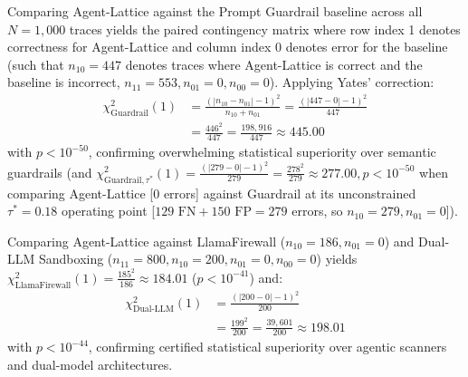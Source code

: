 \documentclass[conference,10pt]{IEEEtran}
\begin{document}
Comparing Agent-Lattice against the Prompt Guardrail baseline across all $N = 1{,}000$ traces yields the paired contingency matrix where row index 1 denotes correctness for Agent-Lattice and column index 0 denotes error for the baseline (such that $n_{10} = 447$ denotes traces where Agent-Lattice is correct and the baseline is incorrect, $n_{11} = 553, n_{01} = 0, n_{00} = 0$). Applying Yates' correction:
\begin{equation}
\begin{split}
\chi^2_{\text{Guardrail}}(1) &= \frac{(|n_{10} - n_{01}| - 1)^2}{n_{10} + n_{01}} = \frac{(|447 - 0| - 1)^2}{447} \\
&= \frac{446^2}{447} = \frac{198{,}916}{447} \approx 445.00
\end{split}
\end{equation}
with $p < 10^{-50}$, confirming overwhelming statistical superiority over semantic guardrails (and $\chi^2_{\text{Guardrail},\tau^*}(1) = \frac{(|279 - 0| - 1)^2}{279} = \frac{278^2}{279} \approx 277.00, p < 10^{-50}$ when comparing Agent-Lattice [$0$ errors] against Guardrail at its unconstrained $\tau^* = 0.18$ operating point [$129\text{ FN} + 150\text{ FP} = 279$ errors, so $n_{10} = 279, n_{01} = 0$]).

Comparing Agent-Lattice against LlamaFirewall ($n_{10} = 186, n_{01} = 0$) and Dual-LLM Sandboxing ($n_{11} = 800, n_{10} = 200, n_{01} = 0, n_{00} = 0$) yields $\chi^2_{\text{LlamaFirewall}}(1) = \frac{185^2}{186} \approx 184.01$ ($p < 10^{-41}$) and:
\begin{equation}
\begin{split}
\chi^2_{\text{Dual-LLM}}(1) &= \frac{(|200 - 0| - 1)^2}{200} \\
&= \frac{199^2}{200} = \frac{39{,}601}{200} \approx 198.01
\end{split}
\end{equation}
with $p < 10^{-44}$, confirming certified statistical superiority over agentic scanners and dual-model architectures.
\end{document}
